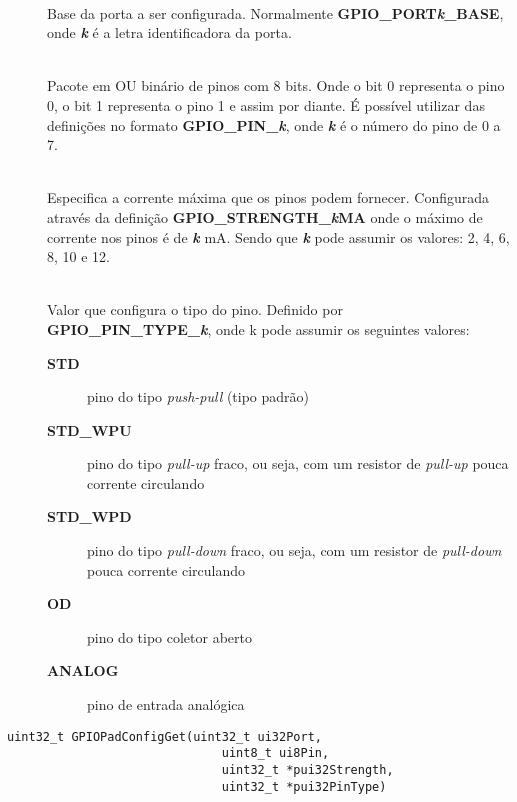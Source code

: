 \begin{description}
	\item []\hfill \\
	Base da porta a ser configurada. Normalmente \textbf{GPIO\_PORT\emph{k}\_BASE}, onde \textbf{\emph{k}} é a letra identificadora da porta.
	
	\item []\hfill \\
	Pacote em OU binário de pinos com 8 bits. Onde o bit 0 representa o pino 0, o bit 1 representa o pino 1 e assim por diante. É possível utilizar das definições no formato  \textbf{GPIO\_PIN\_\emph{k}}, onde \textbf{\emph{k}} é o número do pino de 0 a 7.
	
	\item []\hfill \\
	Especifica a corrente máxima que os pinos podem fornecer. Configurada através da definição \textbf{GPIO\_STRENGTH\_\emph{k}MA} onde o máximo de corrente nos pinos é de \textbf{\emph{k}} mA. Sendo que \textbf{\emph{k}} pode assumir os valores: 2, 4, 6, 8, 10 e 12.
	
	\item []\hfill \\
	Valor que configura o tipo do pino. Definido por \textbf{GPIO\_PIN\_TYPE\_\emph{k}}, onde k pode assumir os seguintes valores:
	\begin{description}
		\item [\textbf{STD}] pino do tipo \emph{push-pull} (tipo padrão)
		\item [\textbf{STD\_WPU}] pino do tipo \emph{pull-up} fraco, ou seja, com um resistor de \emph{pull-up} pouca corrente circulando
		\item [\textbf{STD\_WPD}] pino do tipo \emph{pull-down} fraco, ou seja, com um resistor de \emph{pull-down} pouca corrente circulando
		\item [\textbf{OD}] pino do tipo coletor aberto
		\item [\textbf{ANALOG}] pino de entrada analógica
	\end{description}
\end{description}

\begin{lstlisting}[style=funcao]
	uint32_t GPIOPadConfigGet(uint32_t ui32Port,
							  uint8_t ui8Pin,
							  uint32_t *pui32Strength,
							  uint32_t *pui32PinType)
\end{lstlisting}


